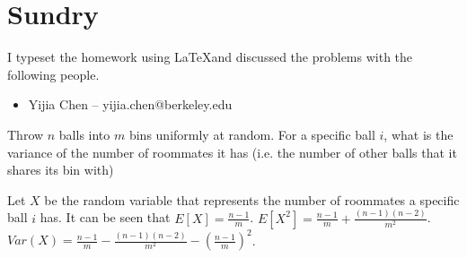 \documentclass[11pt]{article}
\begin{document}
\section*{Sundry}

\begin{Answer}
    I typeset the homework using \LaTeX and discussed the problems with the following people.
    \begin{itemize}
        \item Yijia Chen -- yijia.chen@berkeley.edu
    \end{itemize}
\end{Answer}

\newpage
{}
Throw $n$ balls into $m$ bins uniformly at random. For a specific ball $i$, what is the variance of the 
number of roommates it has (i.e. the number of other balls that it shares its bin with)

\begin{Answer}
    Let $X$ be the random variable that represents the number of roommates a specific ball $i$ has. 
    It can be seen that $E[X] = \frac{n - 1}{m}$. $E[X^2] = \frac{n - 1}{m} + \frac{(n - 1)(n - 2)}{m^2}$. 
    $Var(X) = \frac{n - 1}{m} - \frac{(n - 1)(n - 2)}{m^2} - (\frac{n - 1}{m})^2$.
\end{Answer}

\newpage
{}
\end{document}
